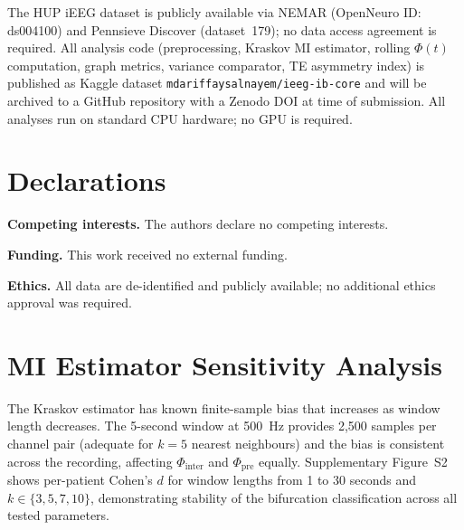 \documentclass[a4paper,fleqn]{cas-dc}
\begin{document}
The HUP iEEG dataset is publicly available via NEMAR (OpenNeuro ID:
ds004100) and Pennsieve Discover (dataset~179); no data access agreement
is required.
%
All analysis code (preprocessing, Kraskov MI estimator, rolling $\Phi(t)$
computation, graph metrics, variance comparator, TE asymmetry index) is
published as Kaggle dataset
\texttt{mdariffaysalnayem/}\allowbreak\texttt{ieeg-ib-core} and
will be archived to a GitHub repository with a Zenodo DOI at time of
submission.
%
All analyses run on standard CPU hardware; no GPU is required.

\section*{Declarations}

\textbf{Competing interests.} The authors declare no competing interests.

\noindent\textbf{Funding.} This work received no external funding.

\noindent\textbf{Ethics.} All data are de-identified and publicly
available; no additional ethics approval was required.

\appendix

\section{MI Estimator Sensitivity Analysis}
\label{app:sensitivity}

The Kraskov estimator has known finite-sample bias that increases as
window length decreases.
%
The 5-second window at 500~Hz provides 2{,}500 samples per channel pair
(adequate for $k = 5$ nearest neighbours) and the bias is consistent
across the recording, affecting $\Phi_{\text{inter}}$ and
$\Phi_{\text{pre}}$ equally.
%
Supplementary Figure~S2 shows per-patient Cohen's $d$ for window
lengths from 1 to 30 seconds and $k \in \{3, 5, 7, 10\}$,
demonstrating stability of the bifurcation classification across all
tested parameters.

\printcredits


\end{document}
